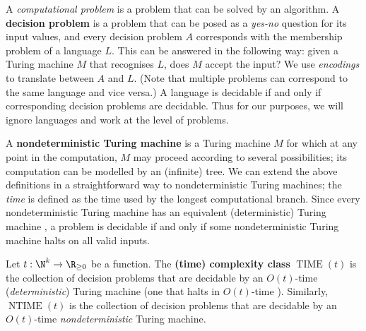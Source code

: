 A \textit{computational problem} is a problem that can be solved by an algorithm. A \textbf{decision problem} is a problem that can be posed as a \textit{yes-no} question for its input values, and every decision problem $A$ corresponds with the membership problem of a language $L$. This can be answered in the following way: given a Turing machine $M$ that recognises $L$, does $M$ accept the input? We use \textit{encodings} to translate between $A$ and $L$. (Note that multiple problems can correspond to the same language and vice versa.) A language is decidable if and only if corresponding decision problems are decidable. Thus for our purposes, we will ignore languages and work at the level of problems.

A \textbf{nondeterministic Turing machine} is a Turing machine $M$ for which at any point in the computation, $M$ may proceed according to several possibilities; its computation can be modelled by an (infinite) tree. We can extend the above definitions in a straightforward way to nondeterministic Turing machines; the \textit{time}  is defined  as the time used by the longest computational branch. Since every nondeterministic Turing machine has an equivalent (deterministic) Turing machine , a problem is decidable if and only if some nondeterministic Turing machine halts on all valid inputs.

\begin{definition}\label{def:time_complexity_class}
    Let $t : \N^k \to \R_{\geq 0}$ be a function. The \textbf{(time) complexity class} $\operatorname{TIME}(t)$ is the collection of decision problems that are decidable by an $O(t)$-time (\textit{deterministic}) Turing machine (one that halts in $O(t)$-time ). Similarly, $\operatorname{NTIME}(t)$ is the collection of decision problems that are decidable by an $O(t)$-time \textit{nondeterministic} Turing machine.

\end{definition}

